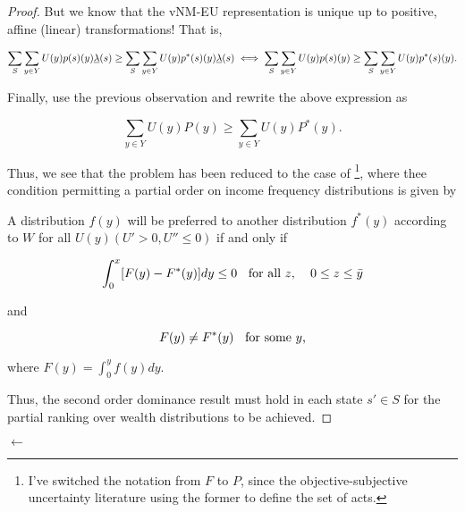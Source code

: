 \documentclass[\econtexRoot/IneqMeas]{subfiles}
\begin{document}
\begin{proof}
	\par But we know that the vNM-EU representation is unique up to positive, affine (linear) transformations! That is,
	
$$  \sum_{S} \sum_{y \in Y} U(y)p(s)(y) \underbar{$\lambda$}(s) \geq  \sum_{S} \sum_{y \in Y} U(y)p^{*}(s)(y) \underbar{$\lambda$}(s) \iff \sum_{S} \sum_{y \in Y} U(y)p(s)(y) \geq  \sum_{S} \sum_{y \in Y} U(y)p^{*}(s)(y).$$	

	\par Finally, use the previous observation and rewrite the above expression as
	
$$  \sum_{y \in Y} U(y)P(y) \geq \sum_{y \in Y} U(y)P^*(y).$$	

	\par Thus, we see that the problem has been reduced to the case of \cite{aa71}\footnote{I've switched the notation from $F$ to $P$, since the objective-subjective uncertainty literature using the former to define the set of acts.}, where thee condition permitting a partial order on income frequency distributions is given by
	
\begin{prop}
A distribution $f(y)$ will be preferred to another distribution $f^{*}(y)$ according to $W$ for all $U(y) (U' > 0, U'' \leq 0)$ if and only if

$$ \int_{0}^{x} [F(y) -F^{*}(y)]dy \leq 0 \text{\hspace{2mm} for all $z$, \hspace{2mm} $0 \leq z \leq \bar{y}$} $$  

and 

$$F(y) \neq F^{*}(y) \text{\hspace{2mm} for some $y$,}$$

where $F(y) = \int_{0}^{y} f(y)dy. $
\end{prop}
	
	\par Thus, the second order dominance result must hold in each state $s' \in S$ for the partial ranking over wealth distributions to be achieved. 
	
\end{proof}	

$\leftarrow$
\end{document}
